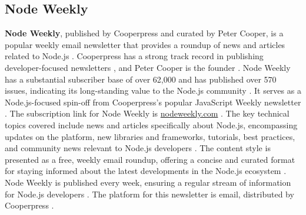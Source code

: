 \documentclass[11pt]{article}
\begin{document}
\subsection{Node Weekly}
\textbf{Node Weekly}, published by Cooperpress and curated by Peter Cooper, is a popular weekly email newsletter that provides a roundup of news and articles related to Node.js \citep{ctoclub2025prognews}. Cooperpress has a strong track record in publishing developer-focused newsletters \citep{cooperpress2025pubs}, and Peter Cooper is the founder \citep{cooperpress2025team}. Node Weekly has a substantial subscriber base of over 62,000 and has published over 570 issues, indicating its long-standing value to the Node.js community \citep{github2025devnewsletters}. It serves as a Node.js-focused spin-off from Cooperpress's popular JavaScript Weekly newsletter \citep{cooperpress2025pubs}. The subscription link for Node Weekly is \url{nodeweekly.com} \citep{ctoclub2025prognews}. The key technical topics covered include news and articles specifically about Node.js, encompassing updates on the platform, new libraries and frameworks, tutorials, best practices, and community news relevant to Node.js developers \citep{ctoclub2025prognews}. The content style is presented as a free, weekly email roundup, offering a concise and curated format for staying informed about the latest developments in the Node.js ecosystem \citep{ctoclub2025prognews}. Node Weekly is published every week, ensuring a regular stream of information for Node.js developers \citep{ctoclub2025prognews}. The platform for this newsletter is email, distributed by Cooperpress \citep{nodeweekly2025site}.
\end{document}
